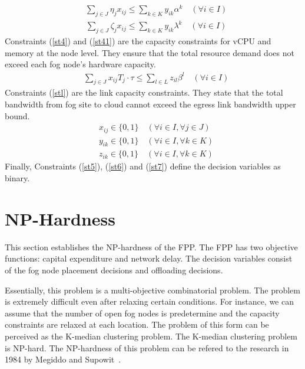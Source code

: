 \documentclass[10pt,journal,compsoc]{IEEEtran}
\newcommand{\Eq}[1]{(\ref{#1})}
\begin{document}
\begin{align}
&\sum_{j\in J} \eta_j x_{ij} \leq \sum_{k\in K} y_{ik}\alpha^k \quad(\forall i \in I)\label{st4}
\end{align}
\begin{align}
&\sum_{j\in J} \zeta_j x_{ij} \leq \sum_{k\in K} y_{ik}\lambda^k \quad(\forall i \in I)\label{st41}
\end{align}
Constraints \Eq{st4} and \Eq{st41} are the capacity constraints for vCPU and memory at the node level. They ensure that the total resource demand does not exceed each fog node's hardware capacity. 
\begin{align}
&\sum_{j\in J} x_{ij} T_j \cdot \tau \leq \sum_{l\in L} z_{il} \beta^l\quad(\forall i \in I) \label{stl}
\end{align}
Constraints \Eq{stl} are the link capacity constraints. They state that the total bandwidth from fog site to cloud cannot exceed the egress link bandwidth upper bound.\\
\begin{align}
&x_{ij} \in \{0,1\} \quad (\forall i \in I, \forall j \in J)\label{st5}\\
& y_{ik} \in \{0,1\} \quad (\forall i \in I, \forall k \in K)\label{st6}\\
& z_{ik} \in \{0,1\} \quad (\forall i \in I, \forall k \in K)\label{st7}
\end{align}
Finally, Constraints \Eq{st5}, \Eq{st6} and \Eq{st7} define the decision variables as binary.

\section{NP-Hardness}\label{nphard}
This section establishes the NP-hardness of the FPP.
The FPP has two objective functions: capital expenditure and network delay. The decision variables consist of the fog node placement decisions and offloading decisions. %

Essentially, this problem is a multi-objective combinatorial problem. The problem is extremely difficult even after relaxing certain conditions. For instance, we can assume that the number of open fog nodes is predetermine and the capacity constraints are relaxed at each location. The problem of this form can be perceived as the K-median clustering problem.
The K-median clustering problem is NP-hard. The NP-hardness of this problem can be refered to the research in 1984 by Megiddo and Supowit~\cite{1984}.
\end{document}
